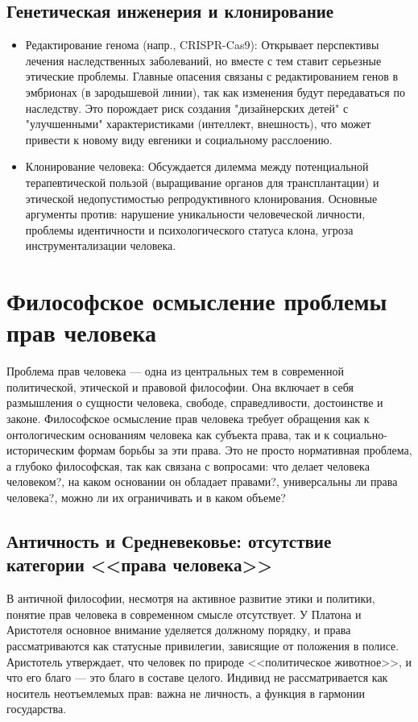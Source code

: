 \documentclass[12pt,a4paper]{article}
\begin{document}
	\subsection{Генетическая инженерия и клонирование}
	\begin{itemize}
		\item Редактирование генома (напр., CRISPR-Cas9): Открывает перспективы лечения наследственных заболеваний, но вместе с тем ставит серьезные этические проблемы. Главные опасения связаны с редактированием генов в эмбрионах (в зародышевой линии), так как изменения будут передаваться по наследству. Это порождает риск создания "дизайнерских детей" с "улучшенными" характеристиками (интеллект, внешность), что может привести к новому виду евгеники и социальному расслоению.
		\item Клонирование человека: Обсуждается дилемма между потенциальной терапевтической пользой (выращивание органов для трансплантации) и этической недопустимостью репродуктивного клонирования. Основные аргументы против: нарушение уникальности человеческой личности, проблемы идентичности и психологического статуса клона, угроза инструментализации человека.
	\end{itemize}
	
	\section{Философское осмысление проблемы прав человека~\checkmark}
	Проблема прав человека — одна из центральных тем в современной политической, этической и правовой философии. Она включает в себя размышления о сущности человека, свободе, справедливости, достоинстве и законе. Философское осмысление прав человека требует обращения как к онтологическим основаниям человека как субъекта права, так и к социально-историческим формам борьбы за эти права. Это не просто нормативная проблема, а глубоко философская, так как связана с вопросами: что делает человека человеком?, на каком основании он обладает правами?, универсальны ли права человека?, можно ли их ограничивать и в каком объеме?
	
	\subsection{Античность и Средневековье: отсутствие категории <<права человека>>}
	В античной философии, несмотря на активное развитие этики и политики, понятие прав человека в современном смысле отсутствует. У Платона и Аристотеля основное внимание уделяется должному порядку, и права рассматриваются как статусные привилегии, зависящие от положения в полисе. Аристотель утверждает, что человек по природе <<политическое животное>>, и что его благо — это благо в составе целого. Индивид не рассматривается как носитель неотъемлемых прав: важна не личность, а функция в гармонии государства.
	
\end{document}
